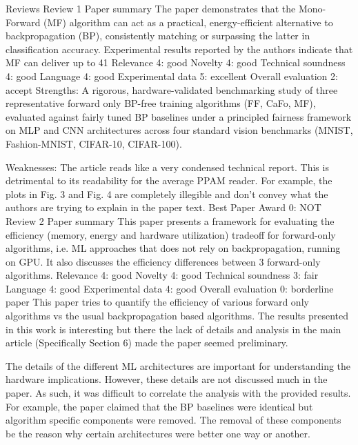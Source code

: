 Reviews
Review 1
Paper summary	The paper demonstrates that the Mono-Forward (MF) algorithm can act as a practical, energy-efficient alternative to backpropagation (BP), consistently matching or surpassing the latter in classification accuracy. Experimental results reported by the authors indicate that MF can deliver up to 41%
Relevance	
4: good
Novelty	
4: good
Technical soundness	
4: good
Language	
4: good
Experimental data	
5: excellent
Overall evaluation	
2: accept
Strengths: A rigorous, hardware-validated benchmarking study of three representative forward only BP-free training algorithms (FF, CaFo, MF), evaluated against fairly tuned BP baselines under a principled fairness framework on MLP and CNN architectures across four standard vision benchmarks (MNIST, Fashion-MNIST, CIFAR-10, CIFAR-100).

Weaknesses: The article reads like a very condensed technical report. This is detrimental to its readability for the average PPAM reader. For example, the plots in Fig. 3 and Fig. 4 are completely illegible and don't convey what the authors are trying to explain in the paper text.
Best Paper Award	
0: NOT
Review 2
Paper summary	This paper presents a framework for evaluating the efficiency (memory, energy and hardware utilization) tradeoff for forward-only algorithms, i.e. ML approaches that does not rely on backpropagation, running on GPU. It also discusses the efficiency differences between 3 forward-only algorithms.
Relevance	
4: good
Novelty	
4: good
Technical soundness	
3: fair
Language	
4: good
Experimental data	
4: good
Overall evaluation	
0: borderline paper
This paper tries to quantify the efficiency of various forward only algorithms vs the usual backpropagation based algorithms. The results presented in this work is interesting but there the lack of details and analysis in the main article (Specifically Section 6) made the paper seemed preliminary.

The details of the different ML architectures are important for understanding the hardware implications. However, these details are not discussed much in the paper. As such, it was difficult to correlate the analysis with the provided results. For example, the paper claimed that the BP baselines were identical but algorithm specific components were removed. The removal of these components be the reason why certain architectures were better one way or another.

